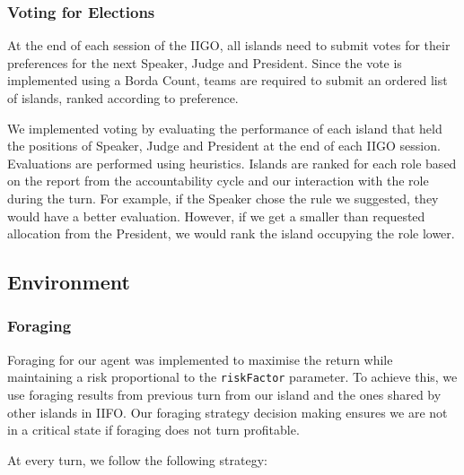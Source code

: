 \subsubsection{Voting for Elections}
At the end of each session of the IIGO, all islands need to submit votes for their preferences for the next Speaker, Judge and President. Since the vote is implemented using a Borda Count, teams are required to submit an ordered list of islands, ranked according to preference. 

We implemented voting by evaluating the performance of each island that held the positions of Speaker, Judge and President at the end of each IIGO session. Evaluations are performed using heuristics. Islands are ranked for each role based on the report from the accountability cycle and our interaction with the role during the turn. For example, if the Speaker chose the rule we suggested, they would have a better evaluation. However, if we get a smaller than requested allocation from the President, we would rank the island occupying the role lower.

\subsection{Environment}

\subsubsection{Foraging}
Foraging for our agent was implemented to maximise the return while maintaining a risk proportional to the \texttt{riskFactor} parameter. To achieve this, we use foraging results from previous turn from our island and the ones shared by other islands in  IIFO.
Our foraging strategy decision making ensures we are not in a critical state if foraging does not turn profitable.

At every turn, we follow the following strategy:

